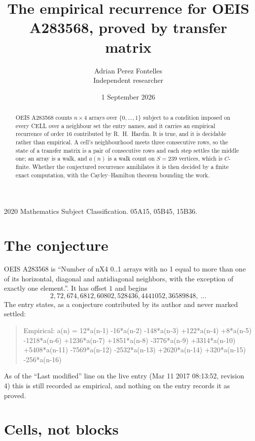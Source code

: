 \documentclass[11pt,a4paper]{article}
\title{The empirical recurrence for OEIS A283568, proved by transfer matrix}
\author{Adrian Perez Fontelles\\ \small Independent researcher}
\date{1 September 2026}
\theoremstyle{plain}
\theoremstyle{definition}
\begin{document}
\maketitle

\begin{abstract}
OEIS A283568 counts $n\times4$ arrays over $\{0,\dots,1\}$ subject to a condition imposed on
every CELL over a neighbour set the entry names, and it carries an empirical recurrence of
order $16$ contributed by R.~H.~Hardin. It is true, and it is decidable rather than
empirical. A cell's neighbourhood meets three consecutive rows, so the state of a transfer
matrix is a pair of consecutive rows and each step settles the middle one; an array is a
walk, and $a(n)$ is a walk count on $S=239$ vertices, which is $C$-finite. Whether the
conjectured recurrence annihilates it is then decided by a finite exact computation, with the
Cayley--Hamilton theorem bounding the work.
\end{abstract}

\noindent\small 2020 Mathematics Subject Classification. 05A15, 05B45, 15B36.\normalsize

\section{The conjecture}

OEIS A283568 is ``Number of nX4 0..1 arrays with no 1 equal to more than one of its horizontal, diagonal and antidiagonal neighbors, with the exception of exactly one element.''. It has offset $1$ and begins
\[
2, 72, 674, 6812, 60802, 528436, 4441052, 36589848,\ \dots
\]
The entry states, as a conjecture contributed by its author and never marked settled:
\begin{quote}
Empirical: a(n) = 12*a(n-1) -16*a(n-2) -148*a(n-3) +122*a(n-4) +8*a(n-5) -1218*a(n-6) +1236*a(n-7) +1851*a(n-8) -3776*a(n-9) +3314*a(n-10) +5408*a(n-11) -7569*a(n-12) -2532*a(n-13) +2620*a(n-14) +320*a(n-15) -256*a(n-16)
\end{quote}
As of the ``Last modified'' line on the live entry (Mar 11 2017 08:13:52, revision 4) this is still
recorded as empirical, and nothing on the entry records it as proved.

\section{Cells, not blocks}
\end{document}
